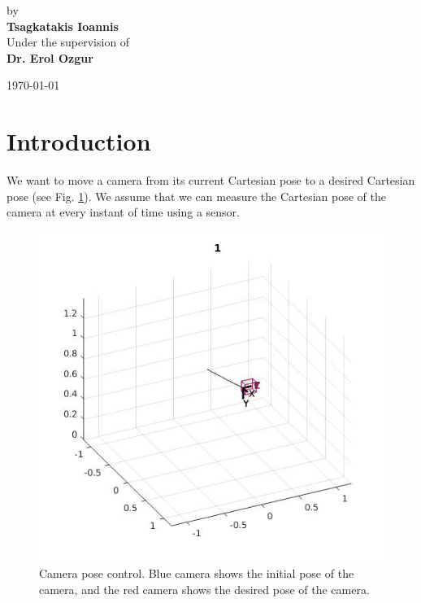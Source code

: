 \documentclass[a4paper,12pt]{article}
\begin{document}
\begin{center}
{ \Large 
	by \\[0.25cm]
	\textbf{Tsagkatakis Ioannis} \\[1.5cm]
	Under the supervision of \\[0.25cm]
	\textbf{Dr. Erol Ozgur} \\
}
\end{center}

\vspace*{2cm}

\begin{center}
	\today
\end{center}
\newpage

\section{Introduction}
We want to move a camera from its current Cartesian pose to a desired Cartesian pose (see Fig. \ref{fig:fig1}). We
assume that we can measure the Cartesian pose of the camera at every instant of time using a sensor.

\begin{figure}[H]
         \centering
         \includegraphics[width=12cm]{../images/pbvs-camera.jpg}
         \caption{Camera pose control. Blue camera shows the initial pose of the camera, and the red camera shows the desired pose of the camera.}
 	\label{fig:fig1}
\end{figure}
\end{document}
